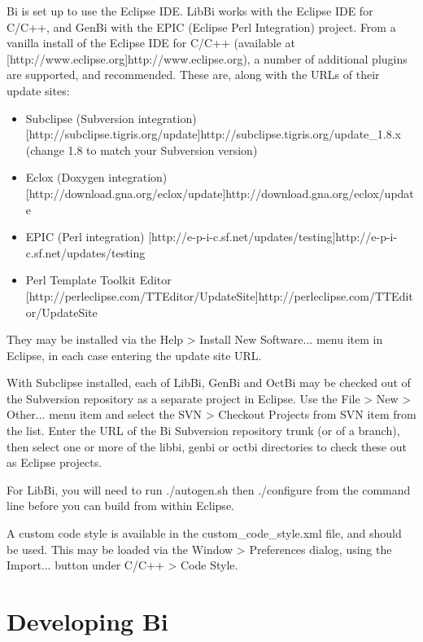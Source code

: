 Bi is set up to use the Eclipse IDE. LibBi works with the Eclipse IDE for
C/C++, and GenBi with the EPIC (Eclipse Perl Integration) project. From a
vanilla install of the Eclipse IDE for C/C++ (available at
\hyperref[hyper][http://www.eclipse.org]{http://www.eclipse.org}), a number of
additional plugins are supported, and recommended. These are, along with the
URLs of their update sites:
\begin{itemize}
\item Subclipse (Subversion integration)
  \hyperref[hyper][http://subclipse.tigris.org/update]{http://subclipse.tigris.org/update\_1.8.x}
  (change 1.8 to match your Subversion version)

\item Eclox (Doxygen integration) \hyperref[hyper][http://download.gna.org/eclox/update]{http://download.gna.org/eclox/update}

\item EPIC (Perl integration) \hyperref[hyper][http://e-p-i-c.sf.net/updates/testing]{http://e-p-i-c.sf.net/updates/testing}

\item Perl Template Toolkit Editor \hyperref[hyper][http://perleclipse.com/TTEditor/UpdateSite]{http://perleclipse.com/TTEditor/UpdateSite}
\end{itemize}
They may be installed via the \textsf{Help > Install New Software...} menu
item in Eclipse, in each case entering the update site URL.

With Subclipse installed, each of LibBi, GenBi and OctBi may be checked out of
the Subversion repository as a separate project in Eclipse. Use the
\textsf{File > New > Other...} menu item and select the \textsf{SVN > Checkout
  Projects from SVN} item from the list. Enter the URL of the Bi Subversion
repository trunk (or of a branch), then select one or more of the
\textsf{libbi}, \textsf{genbi} or \textsf{octbi} directories to check these
out as Eclipse projects.

For LibBi, you will need to run \textsf{./autogen.sh} then
\textsf{./configure} from the command line before you can build from within
Eclipse.

A custom code style is available in the \textsf{custom\_code\_style.xml} file,
and should be used. This may be loaded via the \textsf{Window > Preferences}
dialog, using the \textsf{Import...} button under \textsf{C/C++ > Code Style}.


\section{Developing Bi}

